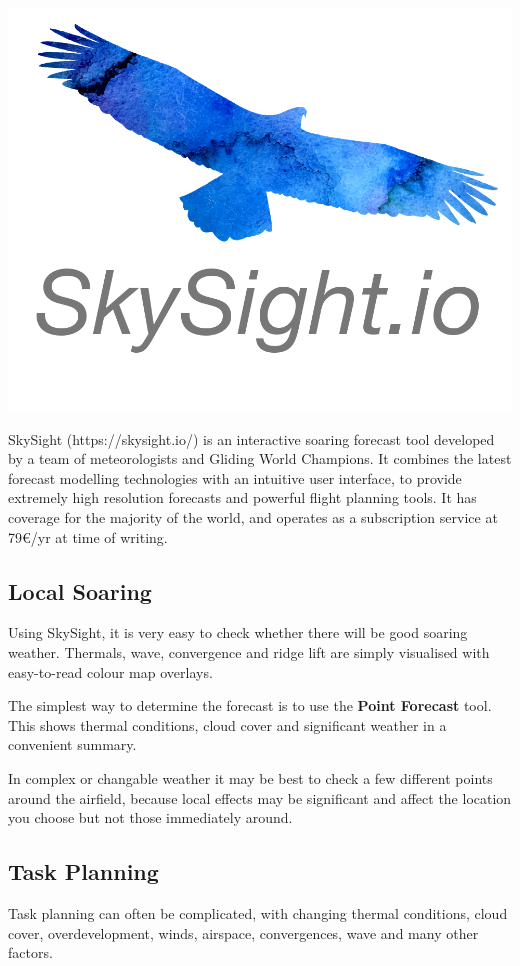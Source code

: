 \documentclass[9pt,a4paper,twocolumn]{article}
\begin{document}
\includegraphics[width=\linewidth]{images/logo.png}

SkySight (https://skysight.io/) is an interactive soaring forecast tool developed by a team of meteorologists and Gliding World Champions. It combines the latest forecast modelling technologies with an intuitive user interface, to provide extremely high resolution forecasts and powerful flight planning tools. It has coverage for the majority of the world, and operates as a subscription service at 79\euro /yr at time of writing.
\subsection*{Local Soaring}
Using SkySight, it is very easy to check whether there will be good soaring weather. Thermals, wave, convergence and ridge lift are simply visualised with easy-to-read colour map overlays.

The simplest way to determine the forecast is to use the \textbf{Point Forecast} tool. This shows thermal conditions, cloud cover and significant weather in a convenient summary.

In complex or changable weather it may be best to check a few different points around the airfield, because local effects may be significant and affect the location you choose but not those immediately around.

\subsection*{Task Planning}
Task planning can often be complicated, with changing thermal conditions, cloud cover, overdevelopment, winds, airspace, convergences, wave and many other factors.
\end{document}
